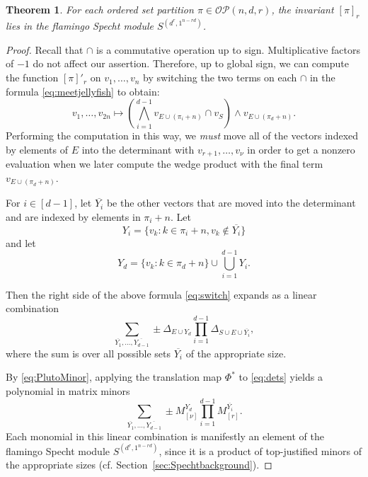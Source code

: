 \documentclass[10pt]{amsart}
\theoremstyle{definition}
\theoremstyle{plain}
\theoremstyle{plain}
\theoremstyle{definition}
\theoremstyle{remark}
\theoremstyle{plain}
\newtheorem{theorem}[cdrthm]{Theorem}
\theoremstyle{plain}
\theoremstyle{plain}
\numberwithin{equation}{section}
\newcommand{\ordsetpart}{\mathcal{OP}}
\begin{document}
\begin{theorem}\label{thm:inspecht}
For each ordered set partition $\pi \in \ordsetpart(n,d,r)$, the invariant $[\pi]_r$ lies in the flamingo Specht module $S^{(d^r, 1^{n-rd})}$.
\end{theorem}
\begin{proof}
Recall that $\cap$ is a commutative operation up to sign. Multiplicative factors of $-1$ do not affect our assertion. Therefore, up to global sign, we can compute the function $[\pi]'_r$ on $v_1,\dots,v_n$ by switching the two terms on each $\cap$ in the formula \eqref{eq:meetjellyfish} to obtain: 
\begin{equation}\label{eq:switch}
v_1,\dots,v_{2n} \mapsto \left(\bigwedge_{i=1}^{d-1} v_{E \cup (\pi_i+n)} \cap v_{S}\right) \wedge v_{ E\cup (\pi_d+n)}.
\end{equation}
Performing the computation in this way, we \emph{must} move all of the vectors indexed by elements of $E$ into the determinant with $v_{r+1},\ldots,v_{\nu}$ in order to get a nonzero evaluation when we later compute the wedge product with the final term $v_{E \cup (\pi_d+n)}$. 

For $i \in [d-1]$, let $\overline{Y_i}$  be the other vectors that are moved into the determinant and are indexed by elements in $\pi_i+n$. 
Let \[
Y_i = \{ v_k : k \in \pi_i+n, v_k \notin \overline{Y_i}\}
\]
and let 
\[Y_d = \{v_k : k \in \pi_d + n \} \cup \bigcup_{i=1}^{d-1}  Y_i.
\]

Then the right side of the above formula \eqref{eq:switch} expands as a linear combination 
\begin{equation}\label{eq:dets}
\sum_{\overline{Y_1},\dots,\overline{Y_{d-1}}}\pm \Delta_{E \cup Y_d}\prod_{i=1}^{d-1}\Delta_{  S \cup E\cup \overline{Y_i}},
\end{equation}
where the sum is over all possible sets $\overline{Y_i}$ of the appropriate size.

By \eqref{eq:PlutoMinor}, applying the translation map $\Phi^*$ to \eqref{eq:dets} yields a polynomial in matrix minors
\begin{equation}
\sum_{\overline{Y_1},\dots,\overline{Y_{d-1}}}\pm M^{Y_d}_{[\nu]}\prod_{i=1}^{d-1}M^{\overline{Y_i}}_{[r]}.
\end{equation}
Each monomial in this linear combination is manifestly an element of the flamingo Specht module $S^{(d^r, 1^{n-rd})}$, since it is a product of top-justified minors of the appropriate sizes (cf. Section~\ref{sec:Spechtbackground}). 
\end{proof}
\end{document}
